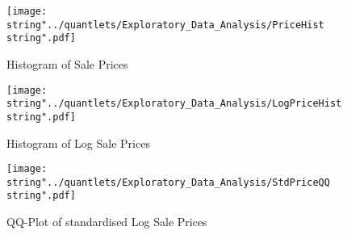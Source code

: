 \begin{figure}
  \centering
\texttt{[image: \\string"../quantlets/Exploratory\_Data\_Analysis/PriceHist\\string".pdf]}
  \caption{Histogram of Sale Prices}\label{fig:pricehist}
\end{figure}

\begin{figure}
  \centering
\texttt{[image: \\string"../quantlets/Exploratory\_Data\_Analysis/LogPriceHist\\string".pdf]}
  \caption{Histogram of Log Sale Prices}\label{fig:logpricehist}
\end{figure}

\begin{figure}
  \centering
\texttt{[image: \\string"../quantlets/Exploratory\_Data\_Analysis/StdPriceQQ\\string".pdf]}
  \caption{QQ-Plot of standardised Log Sale Prices}\label{fig:stdpriceqq}
\end{figure}






